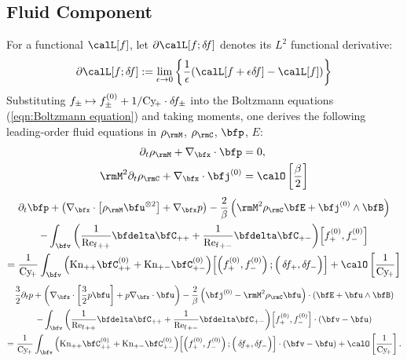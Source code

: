     \line

    \subsection*{Fluid Component}
        For a functional $\calL[f]$, let $\partial\calL[f; \delta\!f]$ denotes its $L^{2}$ functional derivative:
        \begin{equation}
            \partial\calL[f; \delta\!f]  :=  \lim_{\epsilon \rightarrow 0}\left\{\frac{1}{\epsilon}(\calL[f + \epsilon\delta\!f] - \calL[f])\right\}
        \end{equation}
        Substituting $f_{\pm}  \mapsto  f_{\pm}^{(0)} + 1/\mathrm{Cy}\!_{+}\cdot\delta\!f_{\pm}$ into the Boltzmann equations (\ref{eqn:Boltzmann equation}) and taking moments, one derives the following leading-order fluid equations in $\rho_{\rmM}$, $\rho_{\rmC}$, $\bfp$, $E$:
        \begin{align}
            \partial_{t}\rho_{\rmM} + \nabla_{\bfx}\cdot\bfp  &=  0,  \label{eqn:PiC-coupled mass conservation}  \\
            \rmM^{2}\partial_{t}\rho_{\rmC} + \nabla_{\bfx}\cdot\bfj^{(0)}  &=  \calO\left[\frac{\beta}{2}\right]  \label{eqn:PiC-coupled charge conservation}
        \end{align}
        \vspace{-20pt}
        \begin{multline}
            \partial_{t}\bfp + \left(\nabla_{\bfx}\cdot\left[\rho_{\rmM}\bfu^{\otimes 2}\right] + \nabla_{\bfx}p\right) - \frac{2}{\beta}\left(\rmM^{2}\rho_{\rmC}\bfE + \bfj^{(0)}\wedge\bfB\right) \\
            - \int_{\bfv}\left(\frac{1}{{\rmRef}_{++}}\bfdelta\bfC_{++} + \frac{1}{{\rmRef}_{+-}}\bfdelta\bfC_{+-}\right)\!\left[f_{+}^{(0)}, f_{-}^{(0)}\right]  \\
            =  \frac{1}{\rmCy\!_{+}}\int_{\bfv}\left(\rmKn_{++}\bfC_{++}^{(0)} + \rmKn_{+-}\bfC_{+-}^{(0)}\right)\!\left[\left(f_{+}^{(0)}, f_{-}^{(0)}\right); \left({\color{white} f_{+}^{(0)}}\!\!\!\!\!\!\!\!\!\delta\!f_{+}, \delta\!f_{-}\right)\right] + \calO\left[\frac{1}{\rmCy\!_{+}}\right]
        \end{multline}
        \vspace{-20pt}
        \begin{multline}\label{eqn:PiC-coupled pressure conservation}
            \frac{3}{2}\partial_{t}p + \left(\nabla_{\bfx}\cdot\left[\frac{3}{2}p\bfu\right] + p\nabla_{\bfx}\cdot\bfu\right) - \frac{2}{\beta}\left(\bfj^{(0)} - \rmM^{2}\rho_{\rmC}\bfu\right)\cdot(\bfE + \bfu\wedge\bfB)  \\
            - \int_{\bfv}\left(\frac{1}{{\rmRef}_{++}}\bfdelta\bfC_{++} + \frac{1}{{\rmRef}_{+-}}\bfdelta\bfC_{+-}\right)\!\left[f_{+}^{(0)}, f_{-}^{(0)}\right]\cdot(\bfv - \bfu)  \\
            =  \frac{1}{\rmCy\!_{+}}\int_{\bfv}\left(\rmKn_{++}\bfC_{++}^{(0)} + \rmKn_{+-}\bfC_{+-}^{(0)}\right)\!\left[\left(f_{+}^{(0)}, f_{-}^{(0)}\right); \left({\color{white} f_{+}^{(0)}}\!\!\!\!\!\!\!\!\!\delta\!f_{+}, \delta\!f_{-}\right)\right]\cdot(\bfv - \bfu) + \calO\left[\frac{1}{\rmCy\!_{+}}\right].
        \end{multline}
        
